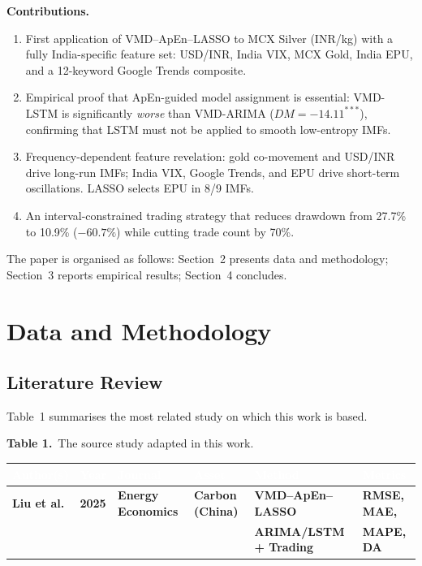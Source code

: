 \documentclass[12pt,a4paper]{article}
\newcommand{\hdrrow}[1]{\textcolor{white}{\textbf{#1}}}
\newcommand{\proprow}{\rowcolor{PropBg}}
\begin{document}
\medskip\noindent\textbf{Contributions.}
\begin{enumerate}[leftmargin=*,itemsep=2pt]
  \item First application of VMD--ApEn--LASSO to MCX Silver (INR/kg) with a fully
        India-specific feature set: USD/INR, India VIX, MCX Gold, India EPU, and a
        12-keyword Google Trends composite.
  \item Empirical proof that ApEn-guided model assignment is essential: VMD-LSTM is
        significantly \emph{worse} than VMD-ARIMA ($DM=-14.11^{***}$), confirming
        that LSTM must not be applied to smooth low-entropy IMFs.
  \item Frequency-dependent feature revelation: gold co-movement and USD/INR drive
        long-run IMFs; India VIX, Google Trends, and EPU drive short-term oscillations.
        LASSO selects EPU in 8/9 IMFs.
  \item An interval-constrained trading strategy that reduces drawdown from 27.7\% to
        10.9\% ($-60.7\%$) while cutting trade count by 70\%.
\end{enumerate}

The paper is organised as follows: Section~2 presents data and methodology;
Section~3 reports empirical results; Section~4 concludes.

\section{Data and Methodology}

\subsection{Literature Review}

Table~1 summarises the most related study on which this work is based.

\vspace{4pt}
\noindent\textbf{Table 1.}~The source study adapted in this work.
\vspace{3pt}

\renewcommand{\arraystretch}{1.18}

\noindent\small
\begin{tabular}{L{2.55cm} C{0.6cm} L{2.7cm} L{1.9cm} L{2.4cm} L{2.0cm}}
\hdrrow{Author(s)} & \hdrrow{Year} & \hdrrow{Journal} & \hdrrow{Asset} & \hdrrow{Method} & \hdrrow{Metrics} \\
\hline
\proprow\textbf{Liu et al.} & \textbf{2025} & \textbf{Energy Economics} & \textbf{Carbon (China)} &
  \textbf{VMD--ApEn--LASSO} & \textbf{RMSE, MAE,} \\
\proprow & & & & \textbf{ARIMA/LSTM + Trading} & \textbf{MAPE, DA} \\
\end{tabular}
\renewcommand{\arraystretch}{1}\normalsize
\vspace{8pt}
\end{document}
